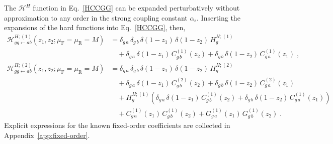 \documentclass[12pt]{article}
\DeclareRobustCommand{\nn}{\nonumber}
\DeclareRobustCommand{\alphas}{\ensuremath{\alpha_{\mathrm{s}}}\xspace}
\DeclareRobustCommand{\as}{\alphas}
\DeclareRobustCommand{\mur}{\ensuremath{\mu_{\mathrm{R}}}\xspace}
\DeclareRobustCommand{\muf}{\ensuremath{\mu_{\mathrm{F}}}\xspace}
\DeclareRobustCommand{\cH}{\ensuremath{\mathcal{H}}}
\begin{document}
The $\cH^H$ function in Eq.~\eqref{HCCGG} can be expanded perturbatively without approximation to any order in the strong coupling constant $\as$. 
Inserting the expansions of the hard functions into Eq.~\eqref{HCCGG}, then,
\begin{align}
  \cH^{H;(1)}_{gg\gets ab}(z_1,z_2; \muf=\mur=M)
  &=
  \delta_{g\,a} \,\delta_{g\,b} 
  \,\delta(1-z_1) \,\delta(1-z_2) 
  \,H^{H;(1)}_g 
  \nn\\&\quad
  +\delta_{g\,a} \,\delta(1-z_1) \,C^{(1)}_{g\,b}(z_2)
  +\delta_{g\,b} \,\delta(1-z_2) \,C^{(1)}_{g\,a}(z_1) \; , 
  \label{H1}
  \\
  \cH^{H;(2)}_{gg\gets ab}(z_1,z_2; \muf=\mur=M)
  &=
  \delta_{g\,a} \,\delta_{g\,b}
  \,\delta(1-z_1) \,\delta(1-z_2) 
  \,H^{H;(2)}_g
  \nn\\&\quad
  +\delta_{g\,a} \,\delta(1-z_1) \,C^{(2)}_{g\,b}(z_2)
  +\delta_{g\,b} \,\delta(1-z_2) \,C^{(2)}_{g\,a}(z_1)
  \nn\\&\quad
  +H^{H;(1)}_g\left(
  \delta_{g\,a} \,\delta(1-z_1) \,C^{(1)}_{g\,b}(z_2) +
  \delta_{g\,b} \,\delta(1-z_2) \,C^{(1)}_{g\,a}(z_1)
  \right)
  \nn\\&\quad
  +C^{(1)}_{g\,a}(z_1) \, C^{(1)}_{g\,b}(z_2)
  +G^{(1)}_{g\,a}(z_1) \, G^{(1)}_{g\,b}(z_2) \; .
  \label{H2}
\end{align}
Explicit expressions for the known fixed-order coefficients are collected in Appendix~\ref{app:fixed-order}. 
\end{document}
